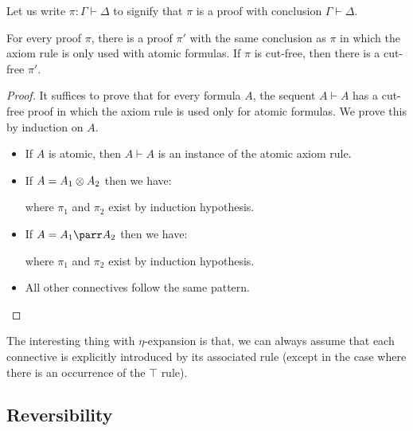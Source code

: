 Let us write \(\pi:\Gamma\vdash\Delta\) to signify that \(\pi\) is a
proof with conclusion \(\Gamma\vdash\Delta\).

\begin{proposition}
For every proof $\pi$, there is a proof $\pi'$ with the
same conclusion as $\pi$ in which the axiom rule is only used with
atomic formulas.
If $\pi$ is cut-free, then there is a cut-free $\pi'$.
\end{proposition}

\begin{proof}
It suffices to prove that for every formula $A$, the sequent
$A\vdash A$ has a cut-free proof in which the axiom rule is used
only for atomic formulas.
We prove this by induction on $A$.
\begin{itemize}
\item If $A$ is atomic, then $A\vdash A$ is an instance of the atomic axiom rule.
\item If $A=A_1\tens A_2$ then we have:
\begin{prooftree}
\end{prooftree}
where $\pi_1$ and $\pi_2$ exist by induction hypothesis.
\item If $A=A_1\parr A_2$ then we have:
\begin{prooftree}
\end{prooftree}
where $\pi_1$ and $\pi_2$ exist by induction hypothesis.
\item All other connectives follow the same pattern.
\qedhere
\end{itemize}
\end{proof}

The interesting thing with \(\eta\)-expansion is that, we can always
assume that each connective is explicitly introduced by its associated
rule (except in the case where there is an occurrence of the \(\top\)
rule).

\subsection{Reversibility}\label{reversibility-1}

